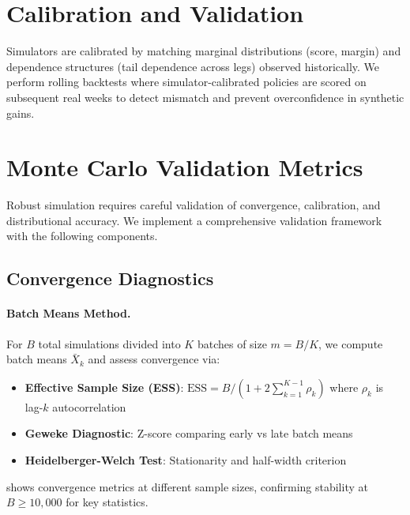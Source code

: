 \section{Calibration and Validation}
Simulators are calibrated by matching marginal distributions (score, margin) and dependence structures (tail dependence across legs) observed historically. We perform rolling backtests where simulator-calibrated policies are scored on subsequent real weeks to detect mismatch and prevent overconfidence in synthetic gains.

\section{Monte Carlo Validation Metrics}
\label{sec:mc-validation}

Robust simulation requires careful validation of convergence, calibration, and distributional accuracy. We implement a comprehensive validation framework with the following components.

\subsection{Convergence Diagnostics}

\paragraph{Batch Means Method.}
For $B$ total simulations divided into $K$ batches of size $m = B/K$, we compute batch means $\bar{X}_k$ and assess convergence via:
\begin{itemize}
  \item \textbf{Effective Sample Size (ESS)}: $\text{ESS} = B / (1 + 2\sum_{k=1}^{K-1} \rho_k)$ where $\rho_k$ is lag-$k$ autocorrelation
  \item \textbf{Geweke Diagnostic}: Z-score comparing early vs late batch means
  \item \textbf{Heidelberger-Welch Test}: Stationarity and half-width criterion
\end{itemize}

 shows convergence metrics at different sample sizes, confirming stability at $B \geq 10,000$ for key statistics.

